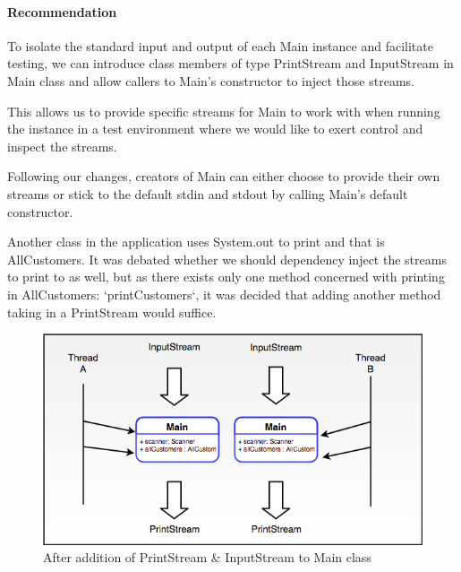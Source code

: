 \paragraph{Recommendation}
To isolate the standard input and output of each Main instance and facilitate testing, we can introduce class members of type PrintStream and InputStream in Main class and allow callers to Main's constructor to inject those streams.
\par
This allows us to provide specific streams for Main to work with when running the instance in a test environment where we would like to exert control and inspect the streams. 
\par 
Following our changes, creators of Main can either choose to provide their own streams or stick to the default stdin and stdout by calling Main's default constructor. 
\par
Another class in the application uses System.out to print and that is AllCustomers. It was debated whether we should dependency inject the streams to print to as well, but as there exists only one method concerned with printing in AllCustomers: `printCustomers`, it was decided that adding another  method taking in a PrintStream would suffice.
\begin{figure}[H]
	\centering
	\includegraphics[scale=0.4]{res/STE-Page-3-original.png}
	\caption{After addition of PrintStream \& InputStream to Main class}
\end{figure}
\par

